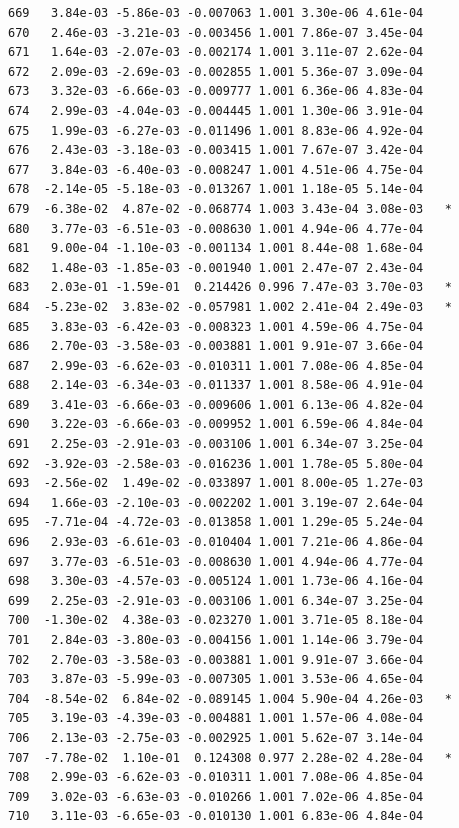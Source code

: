 \documentclass[
  letterpaper,
  DIV=11,
  numbers=noendperiod]{scrartcl}
\begin{document}
\begin{verbatim}
669   3.84e-03 -5.86e-03 -0.007063 1.001 3.30e-06 4.61e-04    
670   2.46e-03 -3.21e-03 -0.003456 1.001 7.86e-07 3.45e-04    
671   1.64e-03 -2.07e-03 -0.002174 1.001 3.11e-07 2.62e-04    
672   2.09e-03 -2.69e-03 -0.002855 1.001 5.36e-07 3.09e-04    
673   3.32e-03 -6.66e-03 -0.009777 1.001 6.36e-06 4.83e-04    
674   2.99e-03 -4.04e-03 -0.004445 1.001 1.30e-06 3.91e-04    
675   1.99e-03 -6.27e-03 -0.011496 1.001 8.83e-06 4.92e-04    
676   2.43e-03 -3.18e-03 -0.003415 1.001 7.67e-07 3.42e-04    
677   3.84e-03 -6.40e-03 -0.008247 1.001 4.51e-06 4.75e-04    
678  -2.14e-05 -5.18e-03 -0.013267 1.001 1.18e-05 5.14e-04    
679  -6.38e-02  4.87e-02 -0.068774 1.003 3.43e-04 3.08e-03   *
680   3.77e-03 -6.51e-03 -0.008630 1.001 4.94e-06 4.77e-04    
681   9.00e-04 -1.10e-03 -0.001134 1.001 8.44e-08 1.68e-04    
682   1.48e-03 -1.85e-03 -0.001940 1.001 2.47e-07 2.43e-04    
683   2.03e-01 -1.59e-01  0.214426 0.996 7.47e-03 3.70e-03   *
684  -5.23e-02  3.83e-02 -0.057981 1.002 2.41e-04 2.49e-03   *
685   3.83e-03 -6.42e-03 -0.008323 1.001 4.59e-06 4.75e-04    
686   2.70e-03 -3.58e-03 -0.003881 1.001 9.91e-07 3.66e-04    
687   2.99e-03 -6.62e-03 -0.010311 1.001 7.08e-06 4.85e-04    
688   2.14e-03 -6.34e-03 -0.011337 1.001 8.58e-06 4.91e-04    
689   3.41e-03 -6.66e-03 -0.009606 1.001 6.13e-06 4.82e-04    
690   3.22e-03 -6.66e-03 -0.009952 1.001 6.59e-06 4.84e-04    
691   2.25e-03 -2.91e-03 -0.003106 1.001 6.34e-07 3.25e-04    
692  -3.92e-03 -2.58e-03 -0.016236 1.001 1.78e-05 5.80e-04    
693  -2.56e-02  1.49e-02 -0.033897 1.001 8.00e-05 1.27e-03    
694   1.66e-03 -2.10e-03 -0.002202 1.001 3.19e-07 2.64e-04    
695  -7.71e-04 -4.72e-03 -0.013858 1.001 1.29e-05 5.24e-04    
696   2.93e-03 -6.61e-03 -0.010404 1.001 7.21e-06 4.86e-04    
697   3.77e-03 -6.51e-03 -0.008630 1.001 4.94e-06 4.77e-04    
698   3.30e-03 -4.57e-03 -0.005124 1.001 1.73e-06 4.16e-04    
699   2.25e-03 -2.91e-03 -0.003106 1.001 6.34e-07 3.25e-04    
700  -1.30e-02  4.38e-03 -0.023270 1.001 3.71e-05 8.18e-04    
701   2.84e-03 -3.80e-03 -0.004156 1.001 1.14e-06 3.79e-04    
702   2.70e-03 -3.58e-03 -0.003881 1.001 9.91e-07 3.66e-04    
703   3.87e-03 -5.99e-03 -0.007305 1.001 3.53e-06 4.65e-04    
704  -8.54e-02  6.84e-02 -0.089145 1.004 5.90e-04 4.26e-03   *
705   3.19e-03 -4.39e-03 -0.004881 1.001 1.57e-06 4.08e-04    
706   2.13e-03 -2.75e-03 -0.002925 1.001 5.62e-07 3.14e-04    
707  -7.78e-02  1.10e-01  0.124308 0.977 2.28e-02 4.28e-04   *
708   2.99e-03 -6.62e-03 -0.010311 1.001 7.08e-06 4.85e-04    
709   3.02e-03 -6.63e-03 -0.010266 1.001 7.02e-06 4.85e-04    
710   3.11e-03 -6.65e-03 -0.010130 1.001 6.83e-06 4.84e-04    

\end{verbatim}
\end{document}
